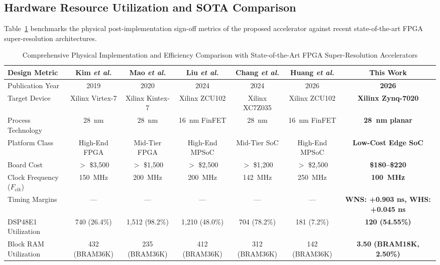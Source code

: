 \documentclass[conference]{IEEEtran}
\begin{document}
\subsection{Hardware Resource Utilization and SOTA Comparison}
\label{sec:sota_comparison}

Table~\ref{tab:sota_extended} benchmarks the physical post-implementation sign-off metrics of the proposed accelerator against recent state-of-the-art FPGA super-resolution architectures.

\begin{table}[!t]
\caption{Comprehensive Physical Implementation and Efficiency Comparison with State-of-the-Art FPGA Super-Resolution Accelerators}
\label{tab:sota_extended}
\centering
\small
\setlength{\tabcolsep}{4.5pt}
\begin{tabular}{lcccccc}
\toprule
\textbf{Design Metric} & \textbf{Kim \textit{et al.} \cite{kim2019real}} & \textbf{Mao \textit{et al.} \cite{mao2020fdna}} & \textbf{Liu \textit{et al.} \cite{liu2024high}} & \textbf{Chang \textit{et al.} \cite{chang2024hdsuper}} & \textbf{Huang \textit{et al.} \cite{huang2026uasr}} & \textbf{This Work} \\
\midrule
Publication Year & 2019 & 2020 & 2024 & 2024 & 2026 & \textbf{2026} \\
Target Device & Xilinx Virtex-7 & Xilinx Kintex-7 & Xilinx ZCU102 & Xilinx XC7Z035 & Xilinx ZCU102 & \textbf{Xilinx Zynq-7020} \\
Process Technology & 28~nm & 28~nm & 16~nm FinFET & 28~nm & 16~nm FinFET & \textbf{28~nm planar} \\
Platform Class & High-End FPGA & Mid-Tier FPGA & High-End MPSoC & Mid-Tier SoC & High-End MPSoC & \textbf{Low-Cost Edge SoC} \\
Board Cost & $>$ \$3,500 & $>$ \$1,500 & $>$ \$2,500 & $>$ \$1,200 & $>$ \$2,500 & \textbf{\$180--\$220} \\
Clock Frequency ($F_{clk}$) & 150~MHz & 200~MHz & 200~MHz & 142~MHz & 250~MHz & \textbf{100~MHz} \\
Timing Margins & --- & --- & --- & --- & --- & \textbf{WNS: +0.903 ns, WHS: +0.045 ns} \\
DSP48E1 Utilization & 740 (26.4\%) & 1,512 (98.2\%) & 1,210 (48.0\%) & 704 (78.2\%) & 181 (7.2\%) & \textbf{120 (54.55\%)} \\
Block RAM Utilization & 432 (BRAM36K) & 235 (BRAM36K) & 412 (BRAM36K) & 312 (BRAM36K) & 142 (BRAM36K) & \textbf{3.50 (BRAM18K, 2.50\%)} \\

\end{tabular}
\end{table}
\end{document}
